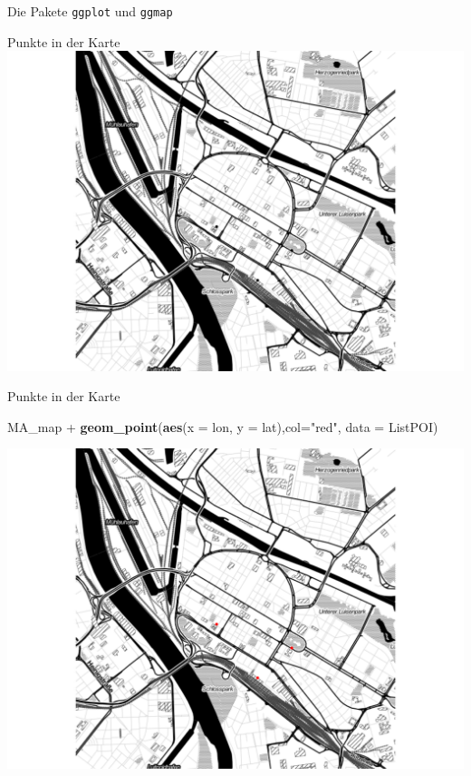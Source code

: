 \documentclass[ignorenonframetext,]{beamer}
\newenvironment{Shaded}{}{}
\newcommand{\KeywordTok}[1]{\textcolor[rgb]{0.00,0.44,0.13}{\textbf{{#1}}}}
\newcommand{\DataTypeTok}[1]{\textcolor[rgb]{0.56,0.13,0.00}{{#1}}}
\newcommand{\StringTok}[1]{\textcolor[rgb]{0.25,0.44,0.63}{{#1}}}
\newcommand{\NormalTok}[1]{{#1}}
\begin{document}
\begin{frame}[fragile]{Die Pakete \texttt{ggplot} und \texttt{ggmap}}
\begin{block}{Punkte in der Karte}
\includegraphics{R_intern_files/figure-beamer/unnamed-chunk-280-1.pdf}

\end{block}

\begin{block}{Punkte in der Karte}

\begin{Shaded}
\begin{Highlighting}[]
\NormalTok{MA_map +}
\KeywordTok{geom_point}\NormalTok{(}\KeywordTok{aes}\NormalTok{(}\DataTypeTok{x =} \NormalTok{lon, }\DataTypeTok{y =} \NormalTok{lat),}\DataTypeTok{col=}\StringTok{"red"}\NormalTok{,}
\DataTypeTok{data =} \NormalTok{ListPOI)}
\end{Highlighting}
\end{Shaded}

\includegraphics{R_intern_files/figure-beamer/unnamed-chunk-281-1.pdf}


\end{block}
\end{frame}
\end{document}
